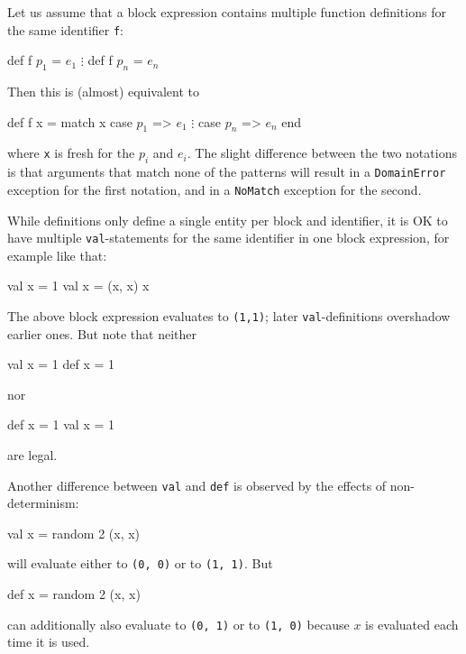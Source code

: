 \documentclass[11pt]{amsart}
\newcommand{\babelsrc}[1] {\lstinline!#1!}
\begin{document}
Let us assume that  a block expression contains multiple function definitions for the same identifier \babelsrc{f}:
\begin{babellisting}
def f $p_1$ = $e_1$ 
   $\vdots$
def f $p_n$ = $e_n$ 
\end{babellisting}
Then this is (almost) equivalent to 
\begin{babellisting}
def f x = 
  match x
    case $p_1$ => $e_1$
      $\vdots$
    case $p_n$ => $e_n$ 
  end
\end{babellisting}
where \babelsrc{x} is fresh for the $p_i$ and $e_i$. The slight difference between the two notations is that arguments that match none of the patterns will result in a \babelsrc{DomainError} exception for the first notation, and in a \babelsrc{NoMatch} exception for the second.

While definitions only define a single entity per block and identifier, it is OK to have multiple \babelsrc{val}-statements for the same identifier in one block expression, for example like that:
\begin{babellisting}
val x = 1
val x = (x, x)
x
\end{babellisting}
The above block expression evaluates to \babelsrc{(1,1)}; later \babelsrc{val}-definitions overshadow earlier ones.
But note that neither
\begin{babellisting}
val x = 1
def x = 1
\end{babellisting}
nor
\begin{babellisting}
def x = 1
val x = 1
\end{babellisting}
are legal.

Another difference between \babelsrc{val} and \babelsrc{def} is observed by the effects of non-determinism:
\begin{babellisting}
val x = random 2
(x, x)
\end{babellisting}
will evaluate either to \babelsrc{(0, 0)} or to \babelsrc{(1, 1)}. But 
\begin{babellisting}
def x = random 2
(x, x)
\end{babellisting}
can additionally also evaluate to \babelsrc{(0, 1)} or to \babelsrc{(1, 0)} because $x$ is evaluated each time it is used.
\end{document}
